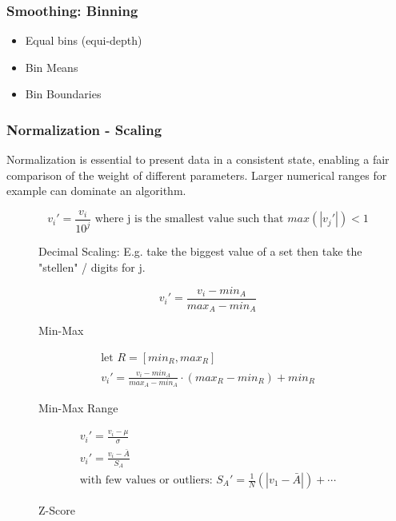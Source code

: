 \documentclass[../Main.tex]{subfiles}
\begin{document}
\subsubsection{Smoothing: Binning}
\begin{itemize}
    \item Equal bins (equi-depth)
    \item Bin Means
    \item Bin Boundaries
\end{itemize}

\subsubsection{Normalization - Scaling}
Normalization is essential to present data in a consistent state, enabling a fair comparison of the weight of 
different parameters. Larger numerical ranges for example can dominate an algorithm.
\begin{figure}[H]
    \begin{equation}
        v_i' = \frac{v_i}{10^j} \text{ where j is the smallest value such that } max(|v_j'|) < 1
    \end{equation}
    \caption{Decimal Scaling: E.g. take the biggest value of a set then take the "stellen" / digits for j.}
\end{figure}
\begin{figure}[H]
    \begin{equation}
        v_i' = \frac{v_i - min_A}{max_A - min_A}
    \end{equation}
    \caption{Min-Max}
\end{figure}
\begin{figure}[H]
    \begin{equation}
        \begin{split}
            \text{let } R = [min_R, max_R] \\
            v_i' = \frac{v_i - min_A}{max_A - min_A} \cdot (max_R - min_R) + min_R
        \end{split}
    \end{equation}
    \caption{Min-Max Range}
\end{figure}
\begin{figure}[H]
    \begin{equation}
        \begin{split}
            v_i' = \frac{v_i - \mu}{\sigma} \\
            v_i' = \frac{v_i - \bar{A}}{S_A} \\
            \text{with few values or outliers: } S_A' = \frac{1}{N} (|v_1 - \bar{A}|) + \cdots
        \end{split}
    \end{equation}
    \caption{Z-Score}
\end{figure}
\end{document}
